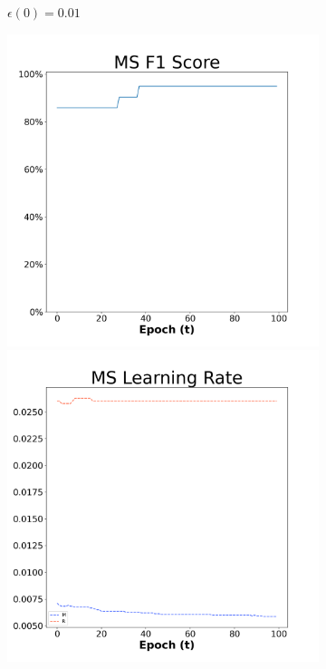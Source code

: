 \begin{figure}[H]
\begin{subfigure}{0.3\textwidth}
  \caption{$\epsilon(0)=0.01$}
\end{subfigure}\hfil %
\begin{subfigure}{0.3\textwidth}
  \includegraphics[width=\linewidth]{images/exper2/Sonar/MS_0.03_f1.png}
  \includegraphics[width=\linewidth]{images/exper2/Sonar/MS_0.03_lr.png}

\end{subfigure}
\end{figure}
